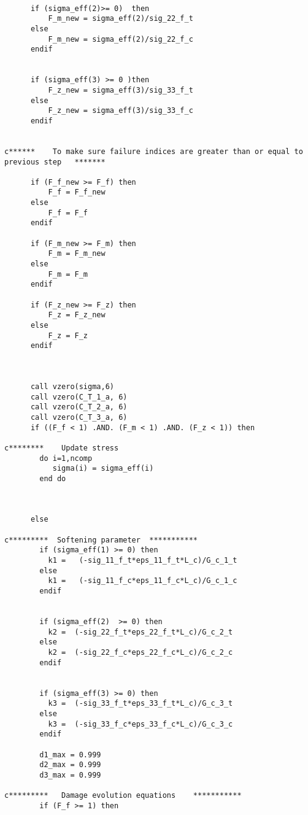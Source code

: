 \begin{lstlisting}
      
      if (sigma_eff(2)>= 0)  then         
          F_m_new = sigma_eff(2)/sig_22_f_t     
      else          
          F_m_new = sigma_eff(2)/sig_22_f_c                
      endif
          
      
      if (sigma_eff(3) >= 0 )then      
          F_z_new = sigma_eff(3)/sig_33_f_t           
      else       
          F_z_new = sigma_eff(3)/sig_33_f_c                     
      endif
            
      
c******    To make sure failure indices are greater than or equal to previous step   *******   
      
      if (F_f_new >= F_f) then          
          F_f = F_f_new          
      else          
          F_f = F_f          
      endif
      
      if (F_m_new >= F_m) then          
          F_m = F_m_new          
      else          
          F_m = F_m          
      endif
          
      if (F_z_new >= F_z) then          
          F_z = F_z_new         
      else          
          F_z = F_z          
      endif
 
      
      
      call vzero(sigma,6)
      call vzero(C_T_1_a, 6) 
      call vzero(C_T_2_a, 6)
      call vzero(C_T_3_a, 6) 
      if ((F_f < 1) .AND. (F_m < 1) .AND. (F_z < 1)) then
 
c********    Update stress
        do i=1,ncomp
           sigma(i) = sigma_eff(i)       
        end do 
          

      
      else
          
c*********  Softening parameter  ***********
        if (sigma_eff(1) >= 0) then
          k1 =   (-sig_11_f_t*eps_11_f_t*L_c)/G_c_1_t
        else 
          k1 =   (-sig_11_f_c*eps_11_f_c*L_c)/G_c_1_c
        endif
        
        
        if (sigma_eff(2)  >= 0) then
          k2 =  (-sig_22_f_t*eps_22_f_t*L_c)/G_c_2_t
        else 
          k2 =  (-sig_22_f_c*eps_22_f_c*L_c)/G_c_2_c
        endif
      
        
        if (sigma_eff(3) >= 0) then
          k3 =  (-sig_33_f_t*eps_33_f_t*L_c)/G_c_3_t
        else 
          k3 =  (-sig_33_f_c*eps_33_f_c*L_c)/G_c_3_c
        endif
       
        d1_max = 0.999
        d2_max = 0.999
        d3_max = 0.999
        
c*********   Damage evolution equations    *********** 	  
        if (F_f >= 1) then
      

\end{lstlisting}
